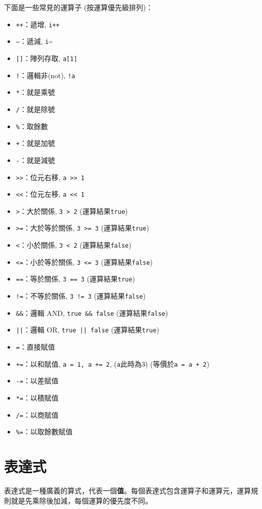 \documentclass[a4paper, 11pt, oneside]{book}
\begin{document}
下面是一些常見的運算子 (按運算優先級排列)：
\begin{itemize}
    \item \texttt{++}：遞增, \texttt{i++}
    \item \texttt{--}：遞減, \texttt{i--}
    \item \texttt{[]}：陣列存取, \texttt{a[1]}
    \item \texttt{!}：邏輯非(not), \texttt{!a}
    \item \texttt{*}：就是乘號
    \item \texttt{/}：就是除號
    \item \texttt{\%}：取餘數
    \item \texttt{+}：就是加號
    \item \texttt{-}：就是減號
    \item \texttt{>>}：位元右移, \texttt{a >> 1}
    \item \texttt{<<}：位元左移, \texttt{a << 1}
    \item \texttt{>}：大於關係, \texttt{3 > 2} (運算結果\texttt{true})
    \item \texttt{>=}：大於等於關係, \texttt{3 >= 3} (運算結果\texttt{true})
    \item \texttt{<}：小於關係, \texttt{3 < 2} (運算結果\texttt{false})
    \item \texttt{<=}：小於等於關係, \texttt{3 <= 3} (運算結果\texttt{false})
    \item \texttt{==}：等於關係, \texttt{3 == 3} (運算結果\texttt{true})
    \item \texttt{!=}：不等於關係, \texttt{3 != 3} (運算結果\texttt{false})
    \item \texttt{\&\&}：邏輯 AND, \texttt{true \&\& false} (運算結果\texttt{false})
    \item \texttt{||}：邏輯 OR, \texttt{true || false} (運算結果\texttt{true})
    \item \texttt{=}：直接賦值
    \item \texttt{+=}：以和賦值, \texttt{a = 1, a += 2}, (\texttt{a}此時為3) (等價於\texttt{a = a + 2})
    \item \texttt{-=}：以差賦值
    \item \texttt{*=}：以積賦值
    \item \texttt{/=}：以商賦值
    \item \texttt{\%=}：以取餘數賦值
\end{itemize}

\section{表達式}
表達式是一種廣義的算式，代表一個\textbf{值}。每個表達式包含運算子和運算元，運算規則就是先乘除後加減，每個運算的優先度不同。
\end{document}
